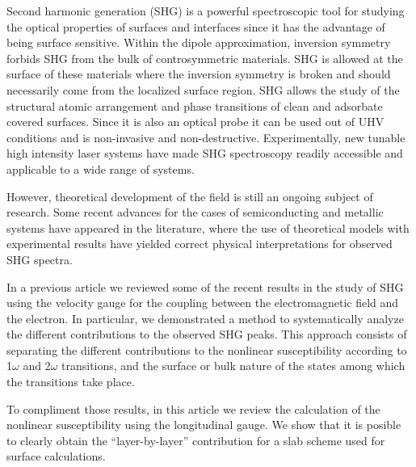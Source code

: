 Second harmonic generation (SHG) is a powerful spectroscopic tool for studying
the optical properties of surfaces and interfaces since it has the advantage
of being surface sensitive. Within the dipole approximation, inversion
symmetry forbids SHG from the bulk of controsymmetric materials. SHG is
allowed at the surface of these materials where the inversion symmetry is
broken and should necessarily come from the localized surface region. SHG
allows the study of the structural atomic arrangement and phase transitions of
clean and adsorbate covered surfaces. Since it is also an optical probe it can
be used out of UHV conditions and is non-invasive and non-destructive.
Experimentally, new tunable high intensity laser systems have made SHG
spectroscopy readily accessible and applicable to a wide range of
systems.\cite{downerSIA01,lupkeSSR99}

However, theoretical development of the field is still an ongoing subject of
research. Some recent advances for the cases of semiconducting and metallic
systems have appeared in the literature, where the use of theoretical models
with experimental results have yielded correct physical interpretations for
observed SHG spectra. \cite{downerSIA01, mendozaPRB01, limPRB00,
gavrilenkoTSF00, mendozaPRB99, mendozaPRL98, mendozaPRB96b, mendozaPRB97,
guyotPRB90}

In a previous article\cite{mendozaEPI04} we reviewed some of the recent
results in the study of SHG using the velocity gauge for the coupling between
the electromagnetic field and the electron. In particular, we demonstrated a
method to systematically analyze the different contributions to the observed
SHG peaks.\cite{arzatePRB01} This approach consists of separating the
different contributions to the nonlinear susceptibility according to 1$\omega$
and 2$\omega$ transitions, and the surface or bulk nature of the states among
which the transitions take place.

To compliment those results, in this article we review the calculation of the
nonlinear susceptibility using the longitudinal gauge. We show that it is
posible to clearly obtain the ``layer-by-layer'' contribution for a slab
scheme used for surface calculations.
